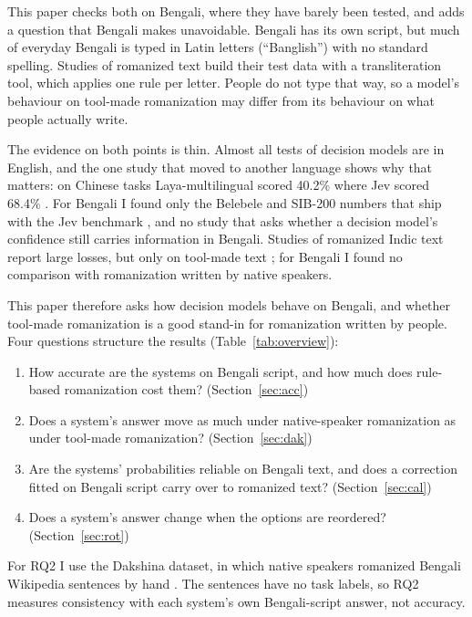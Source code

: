\documentclass[11pt]{article}
\begin{document}
This paper checks both on Bengali, where they have barely been tested, and adds a question that Bengali makes unavoidable.
Bengali has its own script, but much of everyday Bengali is typed in Latin letters (``Banglish'') with no standard spelling.
Studies of romanized text build their test data with a transliteration tool, which applies one rule per letter.
People do not type that way, so a model's behaviour on tool-made romanization may differ from its behaviour on what people actually write.

The evidence on both points is thin.
Almost all tests of decision models are in English, and the one study that moved to another language shows why that matters: on Chinese tasks Laya-multilingual scored 40.2\% where Jev scored 68.4\% \citep{wang2026chinesejev}.
For Bengali I found only the Belebele and SIB-200 numbers that ship with the Jev benchmark \citep{deusser2026jev}, and no study that asks whether a decision model's confidence still carries information in Bengali.
Studies of romanized Indic text report large losses, but only on tool-made text \citep{khullar2025scriptgap,jawad2026fivedialects}; for Bengali I found no comparison with romanization written by native speakers.

This paper therefore asks how decision models behave on Bengali, and whether tool-made romanization is a good stand-in for romanization written by people.
Four questions structure the results (Table~\ref{tab:overview}):
\begin{enumerate}[label=\textbf{RQ\arabic*}]
\item How accurate are the systems on Bengali script, and how much does rule-based romanization cost them? (Section~\ref{sec:acc})
\item Does a system's answer move as much under native-speaker romanization as under tool-made romanization? (Section~\ref{sec:dak})
\item Are the systems' probabilities reliable on Bengali text, and does a correction fitted on Bengali script carry over to romanized text? (Section~\ref{sec:cal})
\item Does a system's answer change when the options are reordered? (Section~\ref{sec:rot})
\end{enumerate}
For RQ2 I use the Dakshina dataset, in which native speakers romanized Bengali Wikipedia sentences by hand \citep{roark2020dakshina}.
The sentences have no task labels, so RQ2 measures consistency with each system's own Bengali-script answer, not accuracy.
\end{document}
